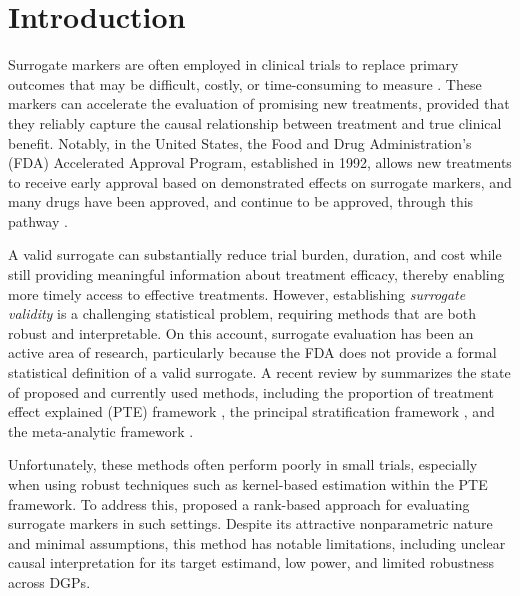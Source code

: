 \documentclass[referee,usenatbib]{biom}
\begin{document}
\section{Introduction}\label{sec:introduction}

Surrogate markers are often employed in clinical trials to replace primary outcomes that may be difficult, costly, or time-consuming to measure \citep{annurev:/content/journals/10.1146/annurev-statistics-032921-035359}. These markers can accelerate the evaluation of promising new treatments, provided that they reliably capture the causal relationship between treatment and true clinical benefit.
Notably, in the United States, the Food and Drug Administration's (FDA) Accelerated Approval Program, established in 1992, allows new treatments to receive early approval based on demonstrated effects on surrogate markers, and many drugs have been approved, and continue to be approved, through this pathway \citep{FDA_AcceleratedApprovalProgram2024,FDA_approved}.

A valid surrogate can substantially reduce trial burden, duration, and cost while still providing meaningful information about treatment efficacy, thereby enabling more timely access to effective treatments. However, establishing \textit{surrogate validity} is a challenging statistical problem, requiring methods that are both robust and interpretable. On this account, surrogate evaluation has been an active area of research, particularly because the FDA does not provide a formal statistical definition of a valid surrogate. A recent review by \citet{elliott2023surrogate} summarizes the state of proposed and currently used methods, including the proportion of treatment effect explained (PTE) framework \citep{freedman1992statistical,wang2002measure,parast2015robust}, the principal stratification framework \citep{frangakis2002principal,gilbert2008evaluating}, and the meta-analytic framework \citep{buyse1998criteria,burzykowski2005evaluation,huang2011comparing}.

Unfortunately, these methods often perform poorly in small trials, especially when using robust techniques such as kernel-based estimation within the PTE framework. To address this, \citet{parast2024rank} proposed a rank-based approach for evaluating surrogate markers in such settings. Despite its attractive nonparametric nature and minimal assumptions, this method has notable limitations, including unclear causal interpretation for its target estimand, low power, and limited robustness across DGPs.
\end{document}
